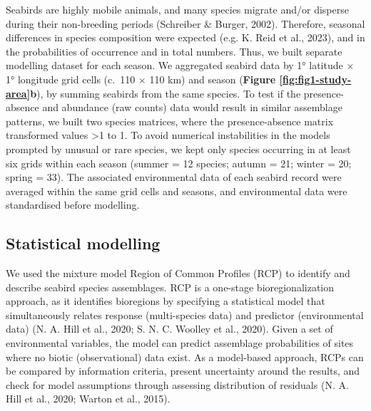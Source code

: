 \documentclass{article}
\begin{document}
\begin{linenumbers}
Seabirds are highly mobile animals, and many species migrate and/or disperse during their non-breeding periods (Schreiber \& Burger, 2002). Therefore, seasonal differences in species composition were expected (e.g. K. Reid et al., 2023), and in the probabilities of occurrence and in total numbers. Thus, we built separate modelling dataset for each season. We aggregated seabird data by 1° latitude \(\times\) 1° longitude grid cells (c.~110 \(\times\) 110 km) and season (\textbf{Figure \ref{fig:fig1-study-area}b}), by summing seabirds from the same species. To test if the presence-absence and abundance (raw counts) data would result in similar assemblage patterns, we built two species matrices, where the presence-absence matrix transformed values \textgreater1 to 1. To avoid numerical instabilities in the models prompted by unusual or rare species, we kept only species occurring in at least six grids within each season (summer = 12 species; autumn = 21; winter = 20; spring = 33). The associated environmental data of each seabird record were averaged within the same grid cells and seasons, and environmental data were standardised before modelling.

\hypertarget{statistical-modelling}{%
\subsection{Statistical modelling}\label{statistical-modelling}}

We used the mixture model Region of Common Profiles (RCP) to identify and describe seabird species assemblages. RCP is a one-stage bioregionalization approach, as it identifies bioregions by specifying a statistical model that simultaneously relates response (multi-species data) and predictor (environmental data) (N. A. Hill et al., 2020; S. N. C. Woolley et al., 2020). Given a set of environmental variables, the model can predict assemblage probabilities of sites where no biotic (observational) data exist. As a model-based approach, RCPs can be compared by information criteria, present uncertainty around the results, and check for model assumptions through assessing distribution of residuals (N. A. Hill et al., 2020; Warton et al., 2015).


\end{linenumbers}
\end{document}
